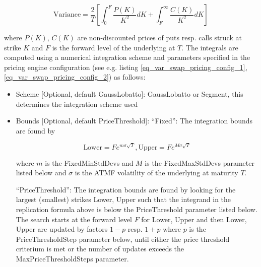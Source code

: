 \begin{equation}\label{eq_varianceswap_replication}
\text{Variance} = \frac{2}{T} \left[ \int_0^F \frac{P(K)}{K^2} dK + \int_F^\infty \frac{C(K)}{K^2} dK \right]
\end{equation}

where $P(K)$, $C(K)$ are non-discounted prices of puts resp. calls struck at strike $K$ and $F$ is the forward level of
the underlying at $T$. The integrals are computed using a numerical integration scheme and parameters specified in the
pricing engine configuration (see e.g. listing \ref{eq_var_swap_pricing_config_1}, \ref{eq_var_swap_pricing_config_2}) as follows:

\begin{itemize}
\item Scheme [Optional, default GaussLobatto]: GaussLobatto or Segment, this determines the integration scheme used
\item Bounds [Optional, default PriceThreshold]: ``Fixed'': The integration bounds are found by
  
  $$
  \text{Lower} = F e ^ {m \sigma \sqrt{T}},  \text{Upper} = F e ^ {M \sigma \sqrt{T}}
  $$

  where $m$ is the FixedMinStdDevs and $M$ is the FixedMaxStdDevs parameter listed below and $\sigma$ is the ATMF
  volatility of the underlying at maturity $T$.

  ``PriceThreshold'': The integration bounds are found by looking for the largest (smallest) strikes Lower, Upper such
  that the integrand in the replication formula above is below the PriceThreshold parameter listed below. The search
  starts at the forward level $F$ for Lower, Upper and then Lower, Upper are updated by factors $1-p$ resp. $1+p$ where
  $p$ is the PriceThresholdStep parameter below, until either the price threshold criterium is met or the number of
  updates exceeds the MaxPriceThresholdSteps parameter.


\end{itemize}
